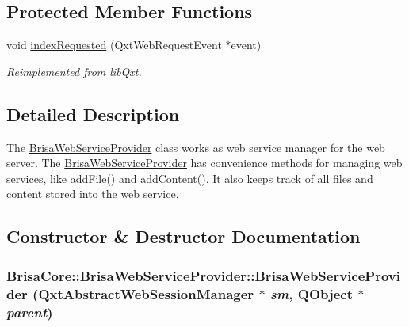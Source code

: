 \subsection*{Protected Member Functions}
\begin{DoxyCompactItemize}
\item 
void \hyperlink{classBrisaCore_1_1BrisaWebServiceProvider_a7f2a7a7f9f22a29cb859478ca518129c}{indexRequested} (QxtWebRequestEvent $\ast$event)
\begin{DoxyCompactList}\small\item\em Reimplemented from libQxt. \item\end{DoxyCompactList}\end{DoxyCompactItemize}


\subsection{Detailed Description}
The \hyperlink{classBrisaCore_1_1BrisaWebServiceProvider}{BrisaWebServiceProvider} class works as web service manager for the web server. The \hyperlink{classBrisaCore_1_1BrisaWebServiceProvider}{BrisaWebServiceProvider} has convenience methods for managing web services, like \hyperlink{classBrisaCore_1_1BrisaWebServiceProvider_a2732014aacccc107547a651499482011}{addFile()} and \hyperlink{classBrisaCore_1_1BrisaWebServiceProvider_a916815911d9293464bf7a2545f46cbfd}{addContent()}. It also keeps track of all files and content stored into the web service. 

\subsection{Constructor \& Destructor Documentation}
\hypertarget{classBrisaCore_1_1BrisaWebServiceProvider_adccc1ffe600411cd23ea2c3524711bfb}{
\subsubsection[{BrisaWebServiceProvider}]{\setlength{\rightskip}{0pt plus 5cm}BrisaCore::BrisaWebServiceProvider::BrisaWebServiceProvider (QxtAbstractWebSessionManager $\ast$ {\em sm}, \/  QObject $\ast$ {\em parent})}}
\label{classBrisaCore_1_1BrisaWebServiceProvider_adccc1ffe600411cd23ea2c3524711bfb}


